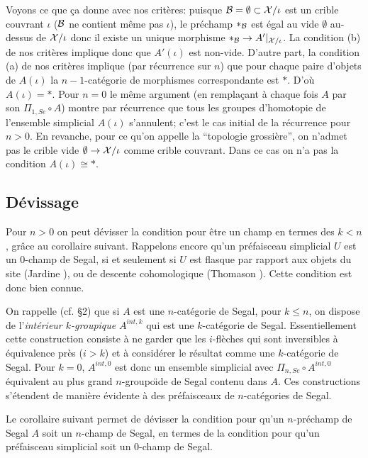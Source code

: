 \documentclass[12pt]{article}
\newcommand{\subnumero}[1]{\subsection*{#1}\phantomsection\addcontentsline{toc}{subsection}{#1}}
\newcommand{\Bb}{{\cal B}}
\newcommand{\Xx}{{\cal X}}
\begin{document}
Voyons ce que \c{c}a donne  avec nos crit\`eres: puisque  $\Bb
=\emptyset \subset \Xx /\iota$ est un crible couvrant $\iota$  ($\Bb
$ ne contient m\^eme pas $\iota$), le pr\'echamp $\ast _{\Bb}$ est
\'egal au vide
$\emptyset$ au-dessus de $\Xx /\iota$ donc il existe un unique morphisme $\ast
_{\Bb}\rightarrow A'|_{\Xx /\iota}$. La condition (b) de nos crit\`eres
implique
donc que $A'(\iota )$ est non-vide. D'autre part, la condition (a) de nos
crit\`eres
implique (par r\'ecurrence sur $n$) que pour chaque paire d'objets de $A(\iota
)$ la
$n-1$-cat\'egorie de morphismes correspondante est $\ast$. D'o\`u $A(\iota
)=\ast$.
Pour $n=0$ le m\^eme argument (en rempla\c{c}ant \`a chaque fois $A$ par son
$\Pi _{1,Se}\circ A$) montre par r\'ecurrence que tous les groupes
d'homotopie de
l'ensemble simplicial $A(\iota )$ s'annulent;
c'est le cas initial de la r\'ecurrence
pour $n>0$.
En revanche, pour ce qu'on appelle la ``topologie grossi\`ere'', on n'admet pas
le crible vide
$\emptyset \rightarrow \Xx /\iota$ comme crible couvrant. Dans ce cas on n'a
pas la condition $A(\iota )\cong \ast$.


\subnumero{D\'evissage}



Pour $n>0$ on peut d\'evisser la condition pour \^etre un champ en termes
des $k<n$,
gr\^ace au corollaire suivant.  Rappelons encore qu'un pr\'efaisceau simplicial
$U$ est un $0$-champ de Segal, si et seulement si $U$ est flasque par
rapport aux objets du site (Jardine \cite{Jardine}), ou
de descente cohomologique (Thomason \cite{Thomason}
\cite{TravauxThomason}). Cette condition est donc bien connue.

On rappelle (cf. \S 2) que si $A$ est une $n$-cat\'egorie de Segal, pour
$k\leq n$, on
dispose de l'{\em int\'erieur $k$-groupique} $A^{int, k}$ qui est une
$k$-cat\'egorie de Segal. Essentiellement cette construction consiste \`a
ne garder que les $i$-fl\`eches qui sont inversibles \`a \'equivalence
pr\`es ($i>k$) et \`a consid\'erer le r\'esultat comme une
$k$-cat\'egorie de Segal. Pour $k=0$, $A^{int, 0}$ est donc un ensemble
simplicial avec $\Pi _{n,Se}\circ A^{int, 0}$ \'equivalent au plus
grand $n$-groupo\"{\i}de de Segal contenu dans $A$. Ces constructions
s'\'etendent de mani\`ere \'evidente \`a des pr\'efaisceaux de $n$-cat\'egories
de Segal.

Le corollaire suivant permet de d\'evisser la condition pour qu'un
$n$-pr\'echamp de
Segal $A$ soit un $n$-champ de Segal, en termes de la condition  pour
qu'un pr\'efaisceau simplicial soit un $0$-champ de Segal.
\end{document}
